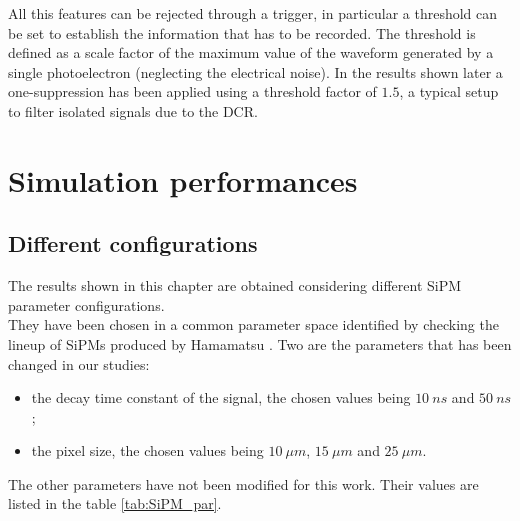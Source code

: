 All this features can be rejected through a trigger, in particular a threshold can be set to establish the information that has to be recorded.
The threshold is defined as a scale factor of the maximum value of the waveform generated by a single photoelectron (neglecting the electrical noise). In the results shown later a one-suppression has been applied using a threshold factor of $1.5$, a typical setup to filter isolated signals due to the DCR.\\

\section{Simulation performances} \label{sec:Sim_perf}

\subsection{Different configurations} \label{subsec:SiPM_conf}
The results shown in this chapter are obtained considering different SiPM parameter configurations.\\
They have been chosen in a common parameter space identified by checking the lineup of SiPMs produced by Hamamatsu \cite{SiPM_lineup}. 
Two are the parameters that has been changed in our studies: 
\begin{itemize}
	\item the decay time constant of the signal, the chosen values being $10\ ns$ and $50\ ns$;
	\item the pixel size, the chosen values being $10\ \mu m$, $15\ \mu m$ and $25\ \mu m$.
\end{itemize}

The other parameters have not been modified for this work. Their values are listed in the table \ref{tab:SiPM_par}.\\

